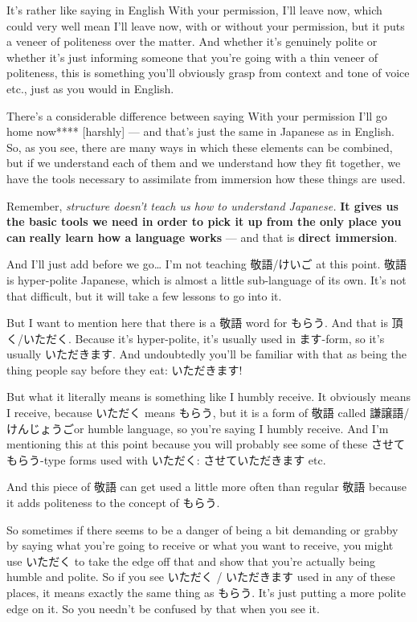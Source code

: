 {}

It's rather like saying in English With your permission, I'll leave now, which could very well mean I'll leave now, with or without your permission, but it puts a veneer of politeness over the matter. And whether it's genuinely polite or whether it's just informing someone that you're going with a thin veneer of politeness, this is something you'll obviously grasp from context and tone of voice etc., just as you would in English.

There's a considerable difference between saying With your permission I'll go home now**** {[}harshly{]} --- and that's just the same in Japanese as in English. So, as you see, there are many ways in which these elements can be combined, but if we understand each of them and we understand how they fit together, we have the tools necessary to assimilate from immersion how these things are used.

Remember, {\em structure doesn't teach us how to understand Japanese.} {\bf It gives us the basic tools we need in order to pick it up from the only place you can} {\bf really learn how a language works} --- and that is {\bf direct immersion}.

\thinrule

And I'll just add before we go\ldots{} I'm not teaching 敬語/けいご at this point. 敬語 is hyper-polite Japanese, which is almost a little sub-language of its own. It's not that difficult, but it will take a few lessons to go into it.

But I want to mention here that there is a 敬語 word for もらう. And that is 頂く/いただく. Because it's hyper-polite, it's usually used in ます-form, so it's usually いただきます. And undoubtedly you'll be familiar with that as being the thing people say before they eat: いただきます!

But what it literally means is something like I humbly receive. It obviously means I receive, because いただく means もらう, but it is a form of 敬語 called 謙譲語/けんじょうごor humble language, so you're saying I humbly receive. And I'm mentioning this at this point because you will probably see some of these させてもらう-type forms used with いただく: させていただきます etc.

And this piece of 敬語 can get used a little more often than regular 敬語 because it adds politeness to the concept of もらう.

{}

So sometimes if there seems to be a danger of being a bit demanding or grabby by saying what you're going to receive or what you want to receive, you might use いただく to take the edge off that and show that you're actually being humble and polite. So if you see いただく / いただきます used in any of these places, it means exactly the same thing as もらう. It's just putting a more polite edge on it. So you needn't be confused by that when you see it.

\stopsectionlevel
